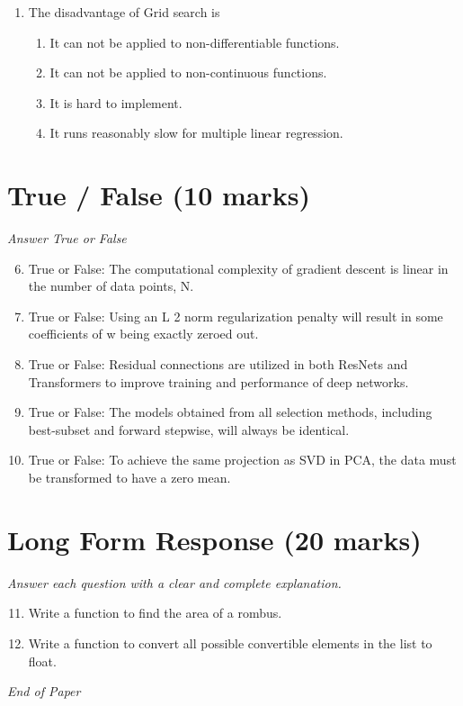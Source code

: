 \documentclass[12pt]{article}
\begin{document}
\begin{enumerate}[label=\arabic*.]
\begin{enumerate}[label=(\alph*)]
    \item False, False
    \item True, False
    \item False, True
\end{enumerate}
\item The disadvantage of Grid search is
\begin{enumerate}[label=(\alph*)]
    \item It can not be applied to non-differentiable functions.
    \item It can not be applied to non-continuous functions.
    \item It is hard to implement.
    \item It runs reasonably slow for multiple linear regression.
\end{enumerate}
\end{enumerate}

\section*{True / False (10 marks)}
\textit{Answer True or False}
\begin{enumerate}[label=\arabic*.]
\setcounter{enumi}{5}
\item True or False: The computational complexity of gradient descent is linear in the number of data points, N.
\item True or False: Using an L 2 norm regularization penalty will result in some coefficients of w being exactly zeroed out.
\item True or False: Residual connections are utilized in both ResNets and Transformers to improve training and performance of deep networks.
\item True or False: The models obtained from all selection methods, including best-subset and forward stepwise, will always be identical.
\item True or False: To achieve the same projection as SVD in PCA, the data must be transformed to have a zero mean.
\end{enumerate}

\section*{Long Form Response (20 marks)}
\textit{Answer each question with a clear and complete explanation.}
\begin{enumerate}[label=\arabic*.]
\setcounter{enumi}{10}
\item Write a function to find the area of a rombus.
\item Write a function to convert all possible convertible elements in the list to float.
\end{enumerate}

\vfill
\noindent\textit{End of Paper}
\end{document}

